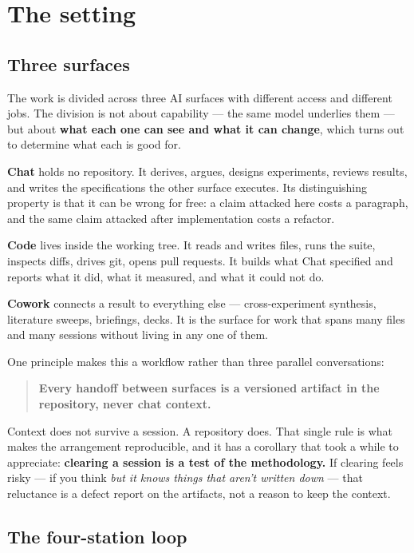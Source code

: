 \section{The setting}

\subsection{Three surfaces}

The work is divided across three AI surfaces with different access and different jobs. The division is not about capability --- the same model underlies them --- but about \textbf{what each one can see and what it can change}, which turns out to determine what each is good for.

\textbf{Chat} holds no repository. It derives, argues, designs experiments, reviews results, and writes the specifications the other surface executes. Its distinguishing property is that it can be wrong for free: a claim attacked here costs a paragraph, and the same claim attacked after implementation costs a refactor.

\textbf{Code} lives inside the working tree. It reads and writes files, runs the suite, inspects diffs, drives git, opens pull requests. It builds what Chat specified and reports what it did, what it measured, and what it could not do.

\textbf{Cowork} connects a result to everything else --- cross-experiment synthesis, literature sweeps, briefings, decks. It is the surface for work that spans many files and many sessions without living in any one of them.

One principle makes this a workflow rather than three parallel conversations:

\begin{quote}
\textbf{Every handoff between surfaces is a versioned artifact in the repository, never chat context.}
\end{quote}

Context does not survive a session. A repository does. That single rule is what makes the arrangement reproducible, and it has a corollary that took a while to appreciate: \textbf{clearing a session is a test of the methodology.} If clearing feels risky --- if you think \textit{but it knows things that aren't written down} --- that reluctance is a defect report on the artifacts, not a reason to keep the context.

\subsection{The four-station loop}

